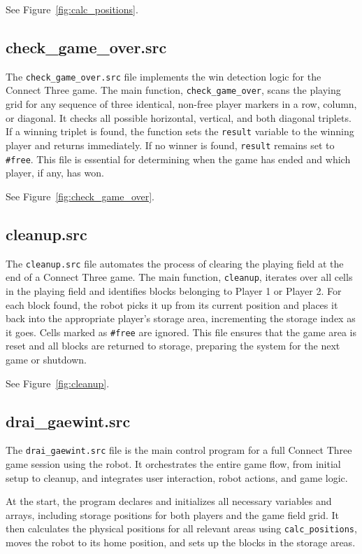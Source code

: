\documentclass{article}
\begin{document}
            See Figure~\ref{fig:calc_positions}.

        \subsection{check\_game\_over.src}
            The \texttt{check\_game\_over.src} file implements the win detection logic for the Connect Three game. The main function, \texttt{check\_game\_over}, scans the playing grid for any sequence of three identical, non-free player markers in a row, column, or diagonal. It checks all possible horizontal, vertical, and both diagonal triplets. If a winning triplet is found, the function sets the \texttt{result} variable to the winning player and returns immediately. If no winner is found, \texttt{result} remains set to \texttt{\#free}. This file is essential for determining when the game has ended and which player, if any, has won.

            See Figure~\ref{fig:check_game_over}.

        \subsection{cleanup.src}
            The \texttt{cleanup.src} file automates the process of clearing the playing field at the end of a Connect Three game. The main function, \texttt{cleanup}, iterates over all cells in the playing field and identifies blocks belonging to Player 1 or Player 2. For each block found, the robot picks it up from its current position and places it back into the appropriate player’s storage area, incrementing the storage index as it goes. Cells marked as \texttt{\#free} are ignored. This file ensures that the game area is reset and all blocks are returned to storage, preparing the system for the next game or shutdown.

            See Figure~\ref{fig:cleanup}.

        \subsection{drai\_gaewint.src}
            The \texttt{drai\_gaewint.src} file is the main control program for a full Connect Three game session using the robot. It orchestrates the entire game flow, from initial setup to cleanup, and integrates user interaction, robot actions, and game logic.

            At the start, the program declares and initializes all necessary variables and arrays, including storage positions for both players and the game field grid. It then calculates the physical positions for all relevant areas using \texttt{calc\_positions}, moves the robot to its home position, and sets up the blocks in the storage areas.
\end{document}
